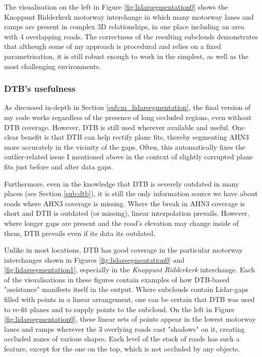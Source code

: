 The visualisation on the left in Figure \ref{fig:lidarsegmentation0} shows the Knoppunt Ridderkerk motorway interchange in which many motorway lanes and ramps are present in complex 3D relationships, in one place including an area with 4 overlapping roads. The correctness of the resulting subclouds demonstrates that although some of my approach is procedural and relies on a fixed parametrisation, it is still robust enough to work in the simplest, as well as the most challenging environments.

\subsubsection{DTB's usefulness}

As discussed in-depth in Section \ref{sub:m_lidarsegmentation}, the final version of my code works regardless of the presence of long occluded regions, even without DTB coverage. However, DTB is still used wherever available and useful. One clear benefit is that DTB can help rectify plane fits, thereby segmenting AHN3 more accurately in the vicinity of the gaps. Often, this automatically fixes the outlier-related issue I mentioned above in the context of slightly corrupted plane fits just before and after data gaps.

Furthermore, even in the knowledge that DTB is severely outdated in many places (see Section \ref{sub:dtb}), it is still the only information source we have about roads where AHN3 coverage is missing. Where the break in AHN3 coverage is short and DTB is outdated (or missing), linear interpolation prevails. However, where longer gaps are present and the road's elevation may change inside of them, DTB prevails even if its data its outdated.

Unlike in most locations, DTB has good coverage in the particular motorway interchanges shown in Figures \ref{fig:lidarsegmentation0} and \ref{fig:lidarsegmentation1}, especially in the \textit{Knoppunt Ridderkerk} interchange. Each of the visualisations in these figures contain examples of how DTB-based "assistance" manifests itself in the output. Where subclouds contain Lidar-gaps filled with points in a linear arrangement, one can be certain that DTB was used to re-fit planes and to supply points to the subcloud. On the left in Figure \ref{fig:lidarsegmentation0}, these linear sets of points appear in the lowest motorway lanes and ramps wherever the 3 overlying roads cast "shadows" on it, creating occluded zones of various shapes. Each level of the stack of roads has such a feature, except for the one on the top, which is not occluded by any objects.

